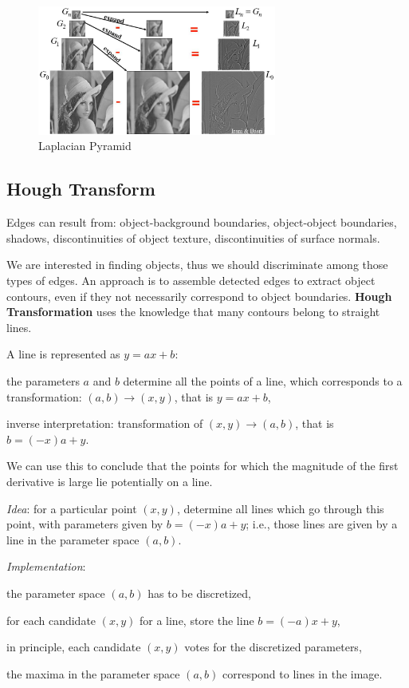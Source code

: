\begin{figure}[!h]
    \centering
    \includegraphics[width=0.7\textwidth]{images/laplacian-pyramid}
    \caption[Laplacian Pyramid]{Laplacian Pyramid}
    \label{fig:laplacian-pyramid}
\end{figure}


\subsection{Hough Transform}\label{sec:bif-hough}

Edges can result from: object-background boundaries, object-object boundaries, shadows, discontinuities of object texture, discontinuities of surface normals.

We are interested in finding objects, thus we should discriminate among those types of edges. An approach is to assemble detected edges to extract object contours, even if they not necessarily correspond to object boundaries. \textbf{Hough Transformation} uses the knowledge that many contours belong to straight lines.

A line is represented as $y = ax + b$:
\begin{myitem}
    \item the parameters $a$ and $b$ determine all the points of a line, which corresponds to a transformation: $(a,b) \longrightarrow (x,y)$, that is $y = ax + b$,
    \item inverse interpretation: transformation of $(x,y) \longrightarrow (a,b)$, that is $b = (-x)a + y$.
\end{myitem}
We can use this to conclude that the points for which the magnitude of the first derivative is large lie potentially on a line.

\textit{Idea}: for a particular point $(x,y)$, determine all lines which go through this point, with parameters given by $b = (-x)a + y$; i.e., those lines are given by a line in the parameter space $(a,b)$.

\textit{Implementation}:
\begin{myitem}
    \item the parameter space $(a,b)$ has to be discretized,
    \item for each candidate $(x,y)$ for a line, store the line $b = (-a) x + y$,
    \item in principle, each candidate $(x,y)$ votes for the discretized parameters,
    \item the maxima in the parameter space $(a,b)$ correspond to lines in the image.
\end{myitem}


